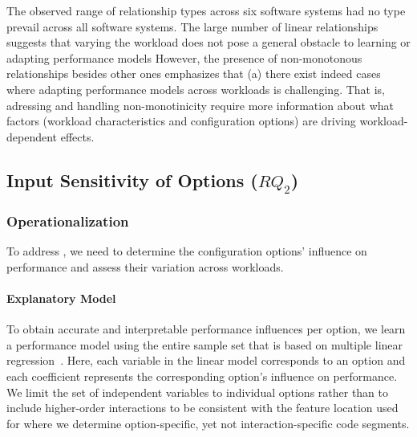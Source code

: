 {The observed range of relationship types across six software systems had no type prevail across all software systems. The large number of linear relationships suggests that varying the workload does not pose a general obstacle to learning or adapting performance models However, the presence of non-monotonous relationships besides other ones emphasizes that (a) there exist indeed cases where adapting performance models across workloads is challenging. That is, adressing and handling non-monotinicity require more information about what factors (workload characteristics and configuration options) are driving workload-dependent effects.
\vspace{2mm}

\subsection{Input Sensitivity of Options ($RQ_2$)}\label{sec:rq2}

\subsubsection{Operationalization}
To address , we need to determine the configuration options’ influence on performance and assess their variation across workloads. 

\paragraph*{Explanatory Model}
To obtain accurate and interpretable performance influences per option, we learn a performance model using the entire sample set that is based on multiple linear regression~\cite{dorn2020,siegmundPerformanceinfluenceModelsHighly2015,perLasso}. Here, each variable in the linear model corresponds to an option and each coefficient represents the corresponding option's influence on performance. 
We limit the set of independent variables to individual options rather than to include higher-order interactions to be consistent with the feature location used for  where we determine option-specific, yet not interaction-specific code segments.

}
